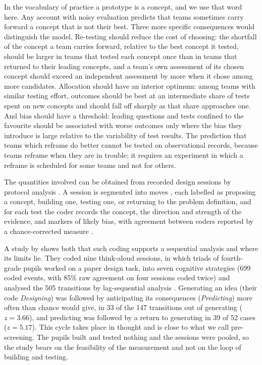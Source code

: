 \documentclass[preprint,review,11pt,authoryear]{elsarticle}
\theoremstyle{definition}
\begin{document}
In the vocabulary of practice a prototype is a concept, and we use that word here. Any account with noisy evaluation predicts that teams sometimes carry forward a concept that is not their best. Three more specific consequences would distinguish the model. Re-testing should reduce the cost of choosing: the shortfall of the concept a team carries forward, relative to the best concept it tested, should be larger in teams that tested each concept once than in teams that returned to their leading concepts, and a team's own assessment of its chosen concept should exceed an independent assessment by more when it chose among more candidates. Allocation should have an interior optimum: among teams with similar testing effort, outcomes should be best at an intermediate share of tests spent on new concepts and should fall off sharply as that share approaches one. And bias should have a threshold: leading questions and tests confined to the favourite should be associated with worse outcomes only where the bias they introduce is large relative to the variability of test results. The prediction that teams which reframe do better cannot be tested on observational records, because teams reframe when they are in trouble; it requires an experiment in which a reframe is scheduled for some teams and not for others.

The quantities involved can be obtained from recorded design sessions by protocol analysis \citep{cross1996}. A session is segmented into moves \citep{goldschmidt2014}, each labelled as proposing a concept, building one, testing one, or returning to the problem definition, and for each test the coder records the concept, the direction and strength of the evidence, and markers of likely bias, with agreement between coders reported by a chance-corrected measure \citep{krippendorff2018}.

A study by \citet{sung2019} shows both that such coding supports a sequential analysis and where its limits lie. They coded nine think-aloud sessions, in which triads of fourth-grade pupils worked on a paper design task, into seven cognitive strategies (699 coded events, with 85\% raw agreement on four sessions coded twice) and analysed the 505 transitions by lag-sequential analysis \citep{bakeman2011}. Generating an idea (their code \emph{Designing}) was followed by anticipating its consequences (\emph{Predicting}) more often than chance would give, in 33 of the 147 transitions out of generating ($z=3.66$), and predicting was followed by a return to generating in 39 of 52 cases ($z=5.17$). This cycle takes place in thought and is close to what we call pre-screening. The pupils built and tested nothing and the sessions were pooled, so the study bears on the feasibility of the measurement and not on the loop of building and testing.
\end{document}
